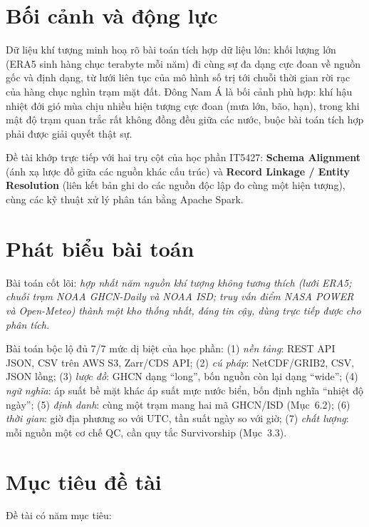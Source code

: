 \documentclass[12pt,a4paper]{report}
\begin{document}
\section{Bối cảnh và động lực}

Dữ liệu khí tượng minh hoạ rõ bài toán tích hợp dữ liệu lớn: khối lượng lớn (ERA5 sinh hàng chục
terabyte mỗi năm) đi cùng sự đa dạng cực đoan về nguồn gốc và định dạng, từ lưới liên tục của mô hình số
trị tới chuỗi thời gian rời rạc của hàng chục nghìn trạm mặt đất. Đông Nam Á là bối cảnh phù hợp: khí hậu
nhiệt đới gió mùa chịu nhiều hiện tượng cực đoan (mưa lớn, bão, hạn), trong khi mật độ trạm quan trắc
rất không đồng đều giữa các nước, buộc bài toán tích hợp phải được giải quyết thật sự.

Đề tài khớp trực tiếp với hai trụ cột của học phần IT5427: \textbf{Schema Alignment} (ánh xạ lược đồ
giữa các nguồn khác cấu trúc) và \textbf{Record Linkage / Entity Resolution} (liên kết bản ghi do các
nguồn độc lập đo cùng một hiện tượng), cùng các kỹ thuật xử lý phân tán bằng Apache Spark.

\section{Phát biểu bài toán}

Bài toán cốt lõi: \emph{hợp nhất năm nguồn khí tượng không tương thích (lưới ERA5; chuỗi trạm NOAA
GHCN-Daily và NOAA ISD; truy vấn điểm NASA POWER và Open-Meteo) thành một kho thống nhất, đáng tin cậy,
dùng trực tiếp được cho phân tích.}

Bài toán bộc lộ đủ 7/7 mức dị biệt của học phần: (1) \emph{nền tảng}: REST API JSON, CSV trên AWS S3,
Zarr/CDS API; (2) \emph{cú pháp}: NetCDF/GRIB2, CSV, JSON lồng; (3) \emph{lược đồ}: GHCN dạng ``long'',
bốn nguồn còn lại dạng ``wide''; (4) \emph{ngữ nghĩa}: áp suất bề mặt khác áp suất mực nước biển, bốn
định nghĩa ``nhiệt độ ngày''; (5) \emph{định danh}: cùng một trạm mang hai mã GHCN/ISD (Mục~6.2); (6)
\emph{thời gian}: giờ địa phương so với UTC, tần suất ngày so với giờ; (7) \emph{chất lượng}: mỗi nguồn
một cơ chế QC, cần quy tắc Survivorship (Mục~3.3).

\section{Mục tiêu đề tài}

Đề tài có năm mục tiêu:
\end{document}

